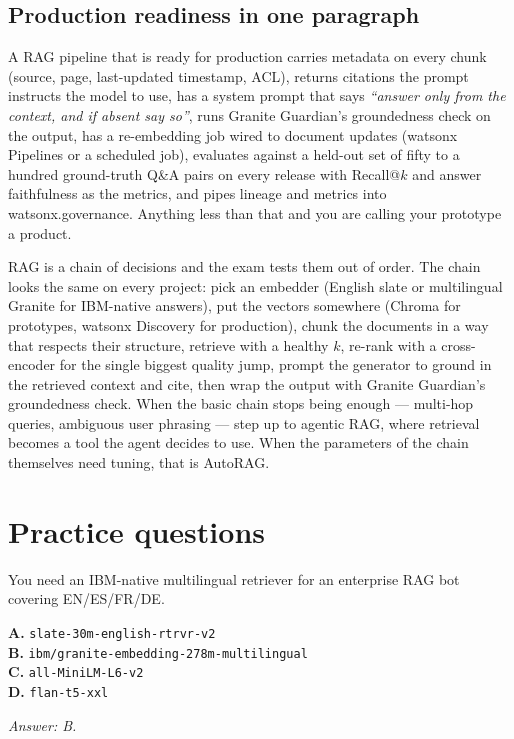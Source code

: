 \subsection{Production readiness in one paragraph}

A RAG pipeline that is ready for production carries metadata on every chunk (source, page, last-updated timestamp, ACL), returns citations the prompt instructs the model to use, has a system prompt that says \emph{``answer only from the context, and if absent say so''}, runs Granite Guardian's groundedness check on the output, has a re-embedding job wired to document updates (watsonx Pipelines or a scheduled job), evaluates against a held-out set of fifty to a hundred ground-truth Q\&A pairs on every release with Recall@$k$ and answer faithfulness as the metrics, and pipes lineage and metrics into watsonx.governance. Anything less than that and you are calling your prototype a product.

\begin{takeawaybox}
RAG is a chain of decisions and the exam tests them out of order. The chain looks the same on every project: pick an embedder (English slate or multilingual Granite for IBM-native answers), put the vectors somewhere (Chroma for prototypes, watsonx Discovery for production), chunk the documents in a way that respects their structure, retrieve with a healthy $k$, re-rank with a cross-encoder for the single biggest quality jump, prompt the generator to ground in the retrieved context and cite, then wrap the output with Granite Guardian's groundedness check. When the basic chain stops being enough --- multi-hop queries, ambiguous user phrasing --- step up to agentic RAG, where retrieval becomes a tool the agent decides to use. When the parameters of the chain themselves need tuning, that is AutoRAG.
\end{takeawaybox}

\section{Practice questions}

\begin{practicebox}[title=\textbf{Q4.1 --- Embedder pick}]
You need an IBM-native multilingual retriever for an enterprise RAG bot covering EN/ES/FR/DE.

\textbf{A.} \texttt{slate-30m-english-rtrvr-v2}\\
\textbf{B.} \texttt{ibm/granite-embedding-278m-multilingual}\\
\textbf{C.} \texttt{all-MiniLM-L6-v2}\\
\textbf{D.} \texttt{flan-t5-xxl}

\vspace{0.2cm}\textit{Answer: B.}
\end{practicebox}

